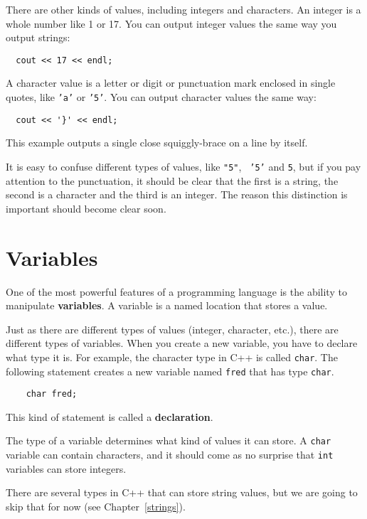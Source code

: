 There are other kinds of values, including integers and characters.
An integer is a whole number like 1 or 17.  You can output
integer values the same way you output strings:

\begin{lstlisting}
  cout << 17 << endl;
\end{lstlisting}
%
A character value is a letter or digit or punctuation mark
enclosed in single quotes, like {\tt 'a'} or {\tt '5'}.
You can output character values the same way:

\begin{lstlisting}
  cout << '}' << endl;
\end{lstlisting}
%
This example outputs a single close squiggly-brace on a line
by itself.

It is easy to confuse different types of values, like {\tt "5"}, {\tt
'5'} and {\tt 5}, but if you pay attention to the punctuation, it
should be clear that the first is a string, the second is a character
and the third is an integer.  The reason this distinction is important
should become clear soon.

\section {Variables}

One of the most powerful features of a programming language is the
ability to manipulate {\bf variables}.  A variable is a named location
that stores a value.  

Just as there are different types of values (integer, character,
etc.), there are different types of variables.  When you create a new
variable, you have to declare what type it is.  For example, the
character type in C++ is called {\tt char}.  The following statement
creates a new variable named {\tt fred} that has type {\tt char}.

\begin{lstlisting}
    char fred;
\end{lstlisting}
%
This kind of statement is called a {\bf declaration}.

The type of a variable determines what kind of values it can
store.  A {\tt char} variable can contain characters, and it should
come as no surprise that {\tt int} variables can store integers.

There are several types in C++ that can store string values, but we
are going to skip that for now (see Chapter~\ref{strings}).

